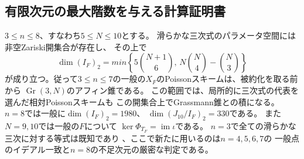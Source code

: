 \subsection{有限次元の最大階数を与える計算証明書}
\begin{theorem}[八次元以下の一般Jacobi行列の階数]
\label{thm:nfold-low-dimensional-generic}
$3\le n\le8$、すなわち$5\le N\le10$とする。
滑らかな三次式のパラメータ空間には非空Zariski開集合が存在し、
その上で
\[
 \dim(I_F)_2=min\left\{5\binom{N+1}{6},\,
                  N\binom N4-\binom N3\right\}
\]
が成り立つ。従って$3\le n\le7$の一般の$X_F$のPoissonスキームは、被約化を取る前から
$\operatorname{Gr}(3,N)$のアフィン錐である。
この範囲では、局所的に三次式の代表を選んだ相対Poissonスキームも
この開集合上でGrassmann錐との積になる。
$n=8$では一般に$\dim(I_F)_2=1980$、
$\dim(J_{10}/I_F)_2=330$である。
また$N=9,10$では一般の$F$について
$\ker\Phi_{T_F}=\operatorname{im}\iota$である。
$n=3$で全ての滑らかな三次に対する等式は既知であり
\cite[Theorem~1, \S2.2]{Mayanskiy}、ここで新たに用いるのは$n=4,5,6,7$の
一般点のイデアル一致と$n=8$の不足次元の厳密な判定である。
\end{theorem}
